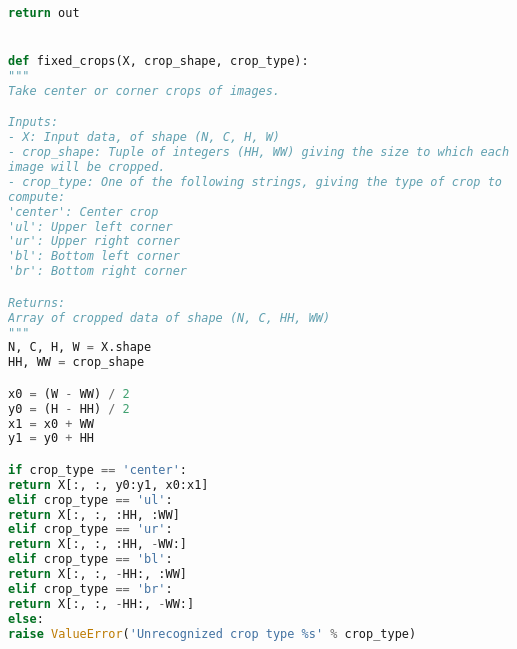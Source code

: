 \begin{lstlisting}[language=Python, label=lst:data_augmentation.py, caption={dataaug.py}, basicstyle=\tiny]
return out


def fixed_crops(X, crop_shape, crop_type):
"""
Take center or corner crops of images.

Inputs:
- X: Input data, of shape (N, C, H, W)
- crop_shape: Tuple of integers (HH, WW) giving the size to which each
image will be cropped.
- crop_type: One of the following strings, giving the type of crop to
compute:
'center': Center crop
'ul': Upper left corner
'ur': Upper right corner
'bl': Bottom left corner
'br': Bottom right corner

Returns:
Array of cropped data of shape (N, C, HH, WW) 
"""
N, C, H, W = X.shape
HH, WW = crop_shape

x0 = (W - WW) / 2
y0 = (H - HH) / 2
x1 = x0 + WW
y1 = y0 + HH

if crop_type == 'center':
return X[:, :, y0:y1, x0:x1]
elif crop_type == 'ul':
return X[:, :, :HH, :WW]
elif crop_type == 'ur':
return X[:, :, :HH, -WW:]
elif crop_type == 'bl':
return X[:, :, -HH:, :WW]
elif crop_type == 'br':
return X[:, :, -HH:, -WW:]
else:
raise ValueError('Unrecognized crop type %s' % crop_type)
\end{lstlisting}